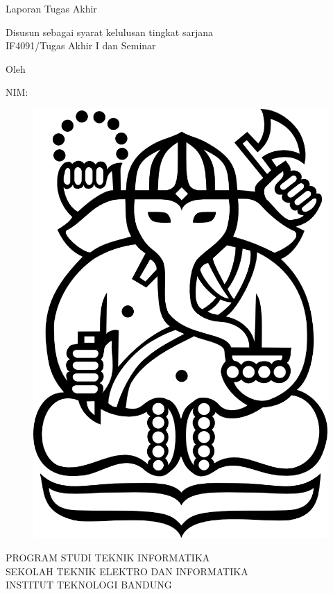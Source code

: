 \clearpage
\pagestyle{empty}

\begin{center}
\smallskip

    \Large \bfseries \MakeUppercase{\judul}
    \vfill

    \Large Laporan Tugas Akhir
    \vfill

    \large Disusun sebagai syarat kelulusan tingkat sarjana\\
    \large IF4091/Tugas Akhir I dan Seminar
    \vfill

    \large Oleh

    \Large \MakeUppercase{\penulis}

    \Large NIM: \nimpenulis

    \vfill
    \begin{figure}[h]
        \centering
        \includegraphics[scale=0.15]{resources/cover-ganesha}
    \end{figure}
    \vfill

    \large
    \uppercase{
        Program Studi Teknik Informatika \\
        Sekolah Teknik Elektro dan Informatika \\
        Institut Teknologi Bandung
    }

    \tanggal

\end{center}

\clearpage
